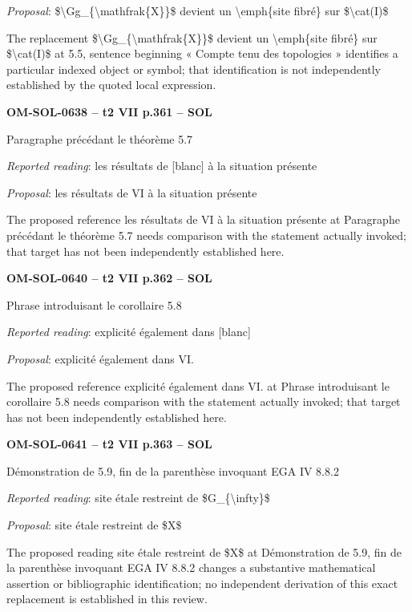 \emph{Proposal}: \$\textbackslash{}Gg\_\{\textbackslash{}mathfrak\{X\}\}\$ devient un \textbackslash{}emph\{site fibré\} sur \$\textbackslash{}cat(I)\$\par
The replacement \$\textbackslash{}Gg\_\{\textbackslash{}mathfrak\{X\}\}\$ devient un \textbackslash{}emph\{site fibré\} sur \$\textbackslash{}cat(I)\$ at 5.5, sentence beginning « Compte tenu des topologies » identifies a particular indexed object or symbol; that identification is not independently established by the quoted local expression.\par
\par\noindent\textbf{OM-SOL-0638 -- t2 VII p.361 -- SOL}\par
Paragraphe précédant le théorème 5.7\par
\emph{Reported reading}: les résultats de [blanc] à la situation présente\par
\emph{Proposal}: les résultats de VI à la situation présente\par
The proposed reference les résultats de VI à la situation présente at Paragraphe précédant le théorème 5.7 needs comparison with the statement actually invoked; that target has not been independently established here.\par
\par\noindent\textbf{OM-SOL-0640 -- t2 VII p.362 -- SOL}\par
Phrase introduisant le corollaire 5.8\par
\emph{Reported reading}: explicité également dans [blanc]\par
\emph{Proposal}: explicité également dans VI.\par
The proposed reference explicité également dans VI. at Phrase introduisant le corollaire 5.8 needs comparison with the statement actually invoked; that target has not been independently established here.\par
\par\noindent\textbf{OM-SOL-0641 -- t2 VII p.363 -- SOL}\par
Démonstration de 5.9, fin de la parenthèse invoquant EGA IV 8.8.2\par
\emph{Reported reading}: site étale restreint de \$G\_\{\textbackslash{}infty\}\$\par
\emph{Proposal}: site étale restreint de \$X\$\par
The proposed reading site étale restreint de \$X\$ at Démonstration de 5.9, fin de la parenthèse invoquant EGA IV 8.8.2 changes a substantive mathematical assertion or bibliographic identification; no independent derivation of this exact replacement is established in this review.\par
